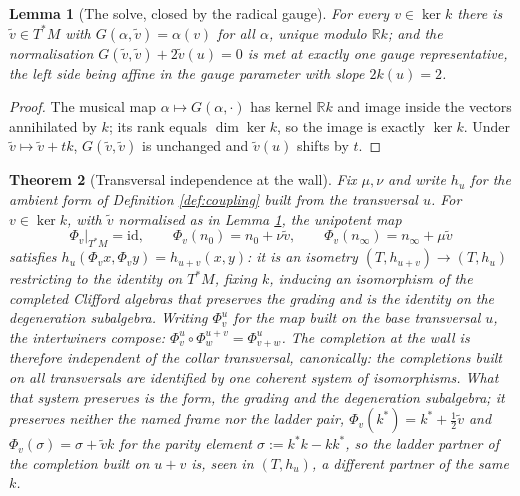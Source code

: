 \documentclass[11pt]{article}
\newtheorem{theorem}{Theorem}[section]
\newtheorem{lemma}[theorem]{Lemma}
\theoremstyle{definition}
\newcommand{\R}{\mathbb{R}}
\newcommand{\id}{\mathrm{id}}
\newcommand{\nO}{n_0}
\newcommand{\nInf}{n_\infty}
\begin{document}
\begin{lemma}[The solve, closed by the radical gauge]\label{lem:wallsolve}
For every $v \in \ker k$ there is $\tilde v \in T^*M$ with $G(\alpha, \tilde v) = \alpha(v)$ for all $\alpha$, unique modulo $\R k$; and the normalisation $G(\tilde v, \tilde v) + 2\tilde v(u) = 0$ is met at exactly one gauge representative, the left side being affine in the gauge parameter with slope $2k(u) = 2$.
\end{lemma}

\begin{proof}
The musical map $\alpha \mapsto G(\alpha, \cdot)$ has kernel $\R k$ and image inside the vectors annihilated by $k$; its rank equals $\dim\ker k$, so the image is exactly $\ker k$. Under $\tilde v \mapsto \tilde v + tk$, $G(\tilde v, \tilde v)$ is unchanged and $\tilde v(u)$ shifts by $t$.
\end{proof}

\begin{theorem}[Transversal independence at the wall]\label{thm:transversal}
Fix $\mu, \nu$ and write $h_u$ for the ambient form of Definition \ref{def:coupling} built from the transversal $u$. For $v \in \ker k$, with $\tilde v$ normalised as in Lemma \ref{lem:wallsolve}, the unipotent map
\[
\Phi_v\big|_{T^*M} = \id, \qquad \Phi_v(\nO) = \nO + \nu\tilde v, \qquad \Phi_v(\nInf) = \nInf + \mu\tilde v
\]
satisfies $h_u(\Phi_v x, \Phi_v y) = h_{u+v}(x, y)$: it is an isometry $(T, h_{u+v}) \to (T, h_u)$ restricting to the identity on $T^*M$, fixing $k$, inducing an isomorphism of the completed Clifford algebras that preserves the grading and is the identity on the degeneration subalgebra. Writing $\Phi^u_v$ for the map built on the base transversal $u$, the intertwiners compose: $\Phi^u_v \circ \Phi^{u+v}_w = \Phi^u_{v+w}$. The completion at the wall is therefore independent of the collar transversal, canonically: the completions built on all transversals are identified by one coherent system of isomorphisms. What that system preserves is the form, the grading and the degeneration subalgebra; it preserves neither the named frame nor the ladder pair, $\Phi_v(k^*) = k^* + \tfrac12\tilde v$ and $\Phi_v(\sigma) = \sigma + \tilde v k$ for the parity element $\sigma := k^*k - kk^*$, so the ladder partner of the completion built on $u + v$ is, seen in $(T, h_u)$, a different partner of the same $k$.
\end{theorem}
\end{document}
